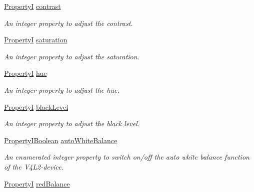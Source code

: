 \begin{DoxyCompactItemize}
\hyperlink{group___common_interface_ga12d5e434238ca242a1ba4c6c3ea45780}{Property\+I} \hyperlink{classmv_i_m_p_a_c_t_1_1acquire_1_1_camera_settings_v4_l2_device_aaee19b888e84b7037f73cf87113a331e}{contrast}
\begin{DoxyCompactList}\small\item\em An integer property to adjust the contrast. \end{DoxyCompactList}\item 
\hyperlink{group___common_interface_ga12d5e434238ca242a1ba4c6c3ea45780}{Property\+I} \hyperlink{classmv_i_m_p_a_c_t_1_1acquire_1_1_camera_settings_v4_l2_device_a9d333663c3d74234ce3e5fadb8aec691}{saturation}
\begin{DoxyCompactList}\small\item\em An integer property to adjust the saturation. \end{DoxyCompactList}\item 
\hyperlink{group___common_interface_ga12d5e434238ca242a1ba4c6c3ea45780}{Property\+I} \hyperlink{classmv_i_m_p_a_c_t_1_1acquire_1_1_camera_settings_v4_l2_device_aecfc16d0f66ee27384d56c99316bd84e}{hue}
\begin{DoxyCompactList}\small\item\em An integer property to adjust the hue. \end{DoxyCompactList}\item 
\hyperlink{group___common_interface_ga12d5e434238ca242a1ba4c6c3ea45780}{Property\+I} \hyperlink{classmv_i_m_p_a_c_t_1_1acquire_1_1_camera_settings_v4_l2_device_a5b72046d92aa57699fd3cd6be2cfcba3}{black\+Level}
\begin{DoxyCompactList}\small\item\em An integer property to adjust the black level. \end{DoxyCompactList}\item 
\hyperlink{group___common_interface_ga44f9437e24b21b6c93da9039ec6786aa}{Property\+I\+Boolean} \hyperlink{classmv_i_m_p_a_c_t_1_1acquire_1_1_camera_settings_v4_l2_device_ab83e95778d35ed8705faf39ba0e5f29b}{auto\+White\+Balance}
\begin{DoxyCompactList}\small\item\em An enumerated integer property to switch on/off the auto white balance function of the V4\+L2-\/device. \end{DoxyCompactList}\item 
\hyperlink{group___common_interface_ga12d5e434238ca242a1ba4c6c3ea45780}{Property\+I} \hyperlink{classmv_i_m_p_a_c_t_1_1acquire_1_1_camera_settings_v4_l2_device_a62eac63a7ff0b0756797e3c7c75c03cf}{red\+Balance}

\end{DoxyCompactItemize}
